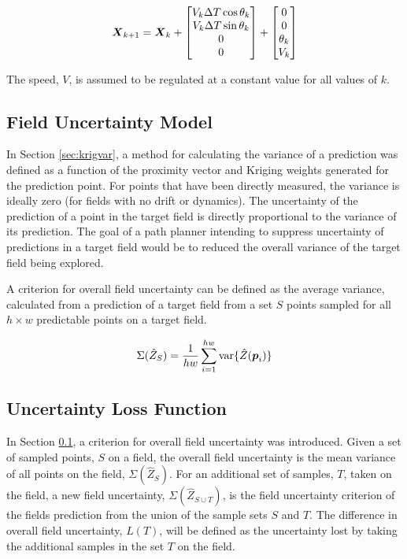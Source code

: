 \begin{equation}
	{\it{\boldsymbol{X}}}_{k+1} = {\it{\boldsymbol{X}}}_k + \begin{bmatrix}
		V_k \Delta T \cos \theta_k \\
		V_k \Delta T \sin \theta_k \\
		0 \\
		0
	\end{bmatrix} + \begin{bmatrix}
	0 \\
	0 \\
	\theta_k \\
	V_k
	\end{bmatrix}
	\label{eq:vehicledynamicsmodel}
\end{equation}

The speed, $V$, is assumed to be regulated at a constant value for all values of $k$.

\subsection{Field Uncertainty Model} \label{sec:fielduncert}
In Section \ref{sec:krigvar}, a method for calculating the variance of a prediction was defined as a function of the proximity vector and Kriging weights generated for the prediction point. For points that have been directly measured, the variance is ideally zero (for fields with no drift or dynamics). The uncertainty of the prediction of a point in the target field is directly proportional to the variance of its prediction. The goal of a path planner intending to suppress uncertainty of predictions in a target field would be to reduced the overall variance of the target field being explored.

A criterion for overall field uncertainty can be defined as the average variance, calculated from a prediction of a target field from a set $S$ points sampled for all $h\times w$ predictable points on a target field.

\begin{equation}
	\Sigma(\hat{Z}_{S}) = \frac{1}{hw}\sum_{i = 1}^{hw} \text{var}\{\hat{Z}({\it{\boldsymbol{p}}}_i)\}
	\label{eq:fielduncert}
\end{equation}

\subsection{Uncertainty Loss Function} \label{sec:lossfunc}
In Section \ref{sec:fielduncert}, a criterion for overall field uncertainty was introduced. Given a set of sampled points, $S$ on a field, the overall field uncertainty is the mean variance of all points on the field, $\Sigma(\hat{Z}_{S})$. For an additional set of samples, $T$, taken on the field, a new field uncertainty, $\Sigma(\hat{Z}_{S \cup T})$, is the field uncertainty criterion of the fields prediction from the union of the sample sets $S$ and $T$. The difference in overall field uncertainty, $L(T)$, will be defined as the uncertainty lost by taking the additional samples in the set $T$ on the field.

